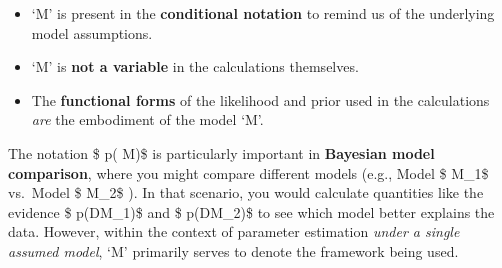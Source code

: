 \documentclass[11pt]{article}
\providecommand{\tightlist}{%
      \setlength{\itemsep}{0pt}\setlength{\parskip}{0pt}}
\begin{document}
\begin{itemize}
\tightlist
\item
  `M' is present in the \textbf{conditional notation} to remind us of
  the underlying model assumptions.
\item
  `M' is \textbf{not a variable} in the calculations themselves.
\item
  The \textbf{functional forms} of the likelihood and prior used in the
  calculations \emph{are} the embodiment of the model `M'.
\end{itemize}

The notation \$ p(\cdot \textbar{} M)\$ is particularly important in
\textbf{Bayesian model comparison}, where you might compare different
models (e.g., Model \$ M\_1\$ vs.~Model \$ M\_2\$ ). In that scenario,
you would calculate quantities like the evidence \$ p(D\textbar M\_1)\$
and \$ p(D\textbar M\_2)\$ to see which model better explains the data.
However, within the context of parameter estimation \emph{under a single
assumed model}, `M' primarily serves to denote the framework being used.
\end{document}
